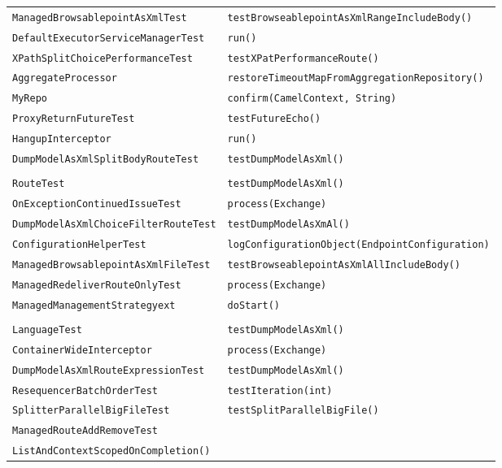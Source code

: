 \begin{center}
\begin{longtable}{ll}
\lstinline/ManagedBrowsablepointAsXmlTest/&{\lstinline/testBrowseablepointAsXmlRangeIncludeBody()/}\\
\lstinline/DefaultExecutorServiceManagerTest/&{\lstinline/run()/}\\
\lstinline/XPathSplitChoicePerformanceTest/&{\lstinline/testXPatPerformanceRoute()/}\\
\lstinline/AggregateProcessor/&{\lstinline/restoreTimeoutMapFromAggregationRepository()/}\\
\lstinline/MyRepo/&{\lstinline/confirm(CamelContext, String)/}\\
\lstinline/ProxyReturnFutureTest/&{\lstinline/testFutureEcho()/}\\
\lstinline/HangupInterceptor/&{\lstinline/run()/}\\
\lstinline/DumpModelAsXmlSplitBodyRouteTest/&{\lstinline/testDumpModelAsXml()/}\\
\raisebox{-13pt}{\shortstack{\lstinline/DumpModelAsXmlSplitNestedChoice/-\\\lstinline/RouteTest/}}&{\lstinline/testDumpModelAsXml()/}\\
\lstinline/OnExceptionContinuedIssueTest/&{\lstinline/process(Exchange)/}\\
\lstinline/DumpModelAsXmlChoiceFilterRouteTest/&{\lstinline/testDumpModelAsXmAl()/}\\
\lstinline/ConfigurationHelperTest/&{\lstinline/logConfigurationObject(EndpointConfiguration)/}\\
\lstinline/ManagedBrowsablepointAsXmlFileTest/&{\lstinline/testBrowseablepointAsXmlAllIncludeBody()/}\\
\lstinline/ManagedRedeliverRouteOnlyTest/&{\lstinline/process(Exchange)/}\\
\lstinline/ManagedManagementStrategyext/&{\lstinline/doStart()/}\\
\raisebox{-13pt}{\shortstack{\lstinline/DumpModelAsXmlTransformRoute/-\\\lstinline/LanguageTest/}}&{\lstinline/testDumpModelAsXml()/}\\
\lstinline/ContainerWideInterceptor/&{\lstinline/process(Exchange)/}\\
\lstinline/DumpModelAsXmlRouteExpressionTest/&{\lstinline/testDumpModelAsXml()/}\\
\lstinline/ResequencerBatchOrderTest/&{\lstinline/testIteration(int)/}\\
\lstinline/SplitterParallelBigFileTest/&{\lstinline/testSplitParallelBigFile()/}\\
\lstinline/ManagedRouteAddRemoveTest/&\raisebox{-13pt}{\shortstack{\lstinline/testRouteAddRemoteRouteWithRecipient/-\\\lstinline/ListAndContextScopedOnCompletion()/}}\\

\end{longtable}
\end{center}

